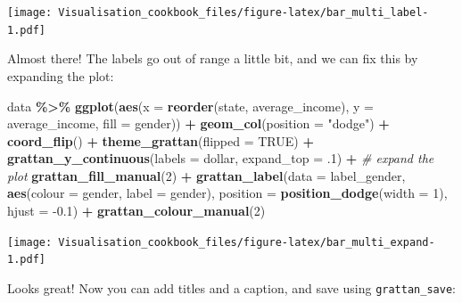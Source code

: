 \documentclass[
]{book}
\newenvironment{Shaded}{\begin{snugshade}}{\end{snugshade}}
\newcommand{\CommentTok}[1]{\textcolor[rgb]{0.56,0.35,0.01}{\textit{#1}}}
\newcommand{\DataTypeTok}[1]{\textcolor[rgb]{0.13,0.29,0.53}{#1}}
\newcommand{\DecValTok}[1]{\textcolor[rgb]{0.00,0.00,0.81}{#1}}
\newcommand{\FloatTok}[1]{\textcolor[rgb]{0.00,0.00,0.81}{#1}}
\newcommand{\KeywordTok}[1]{\textcolor[rgb]{0.13,0.29,0.53}{\textbf{#1}}}
\newcommand{\NormalTok}[1]{#1}
\newcommand{\OperatorTok}[1]{\textcolor[rgb]{0.81,0.36,0.00}{\textbf{#1}}}
\newcommand{\OtherTok}[1]{\textcolor[rgb]{0.56,0.35,0.01}{#1}}
\newcommand{\StringTok}[1]{\textcolor[rgb]{0.31,0.60,0.02}{#1}}
\begin{document}
\texttt{[image: Visualisation\_cookbook\_files/figure-latex/bar\_multi\_label-1.pdf]}

Almost there! The labels go out of range a little bit, and we can fix this by expanding the plot:

\begin{Shaded}
\begin{Highlighting}[]
\NormalTok{data }\OperatorTok{\%\textgreater{}\%}\StringTok{ }
\StringTok{  }\KeywordTok{ggplot}\NormalTok{(}\KeywordTok{aes}\NormalTok{(}\DataTypeTok{x =} \KeywordTok{reorder}\NormalTok{(state, average\_income),}
             \DataTypeTok{y =}\NormalTok{ average\_income,}
             \DataTypeTok{fill =}\NormalTok{ gender)) }\OperatorTok{+}\StringTok{ }
\StringTok{  }\KeywordTok{geom\_col}\NormalTok{(}\DataTypeTok{position =} \StringTok{"dodge"}\NormalTok{) }\OperatorTok{+}\StringTok{ }
\StringTok{  }\KeywordTok{coord\_flip}\NormalTok{() }\OperatorTok{+}\StringTok{ }
\StringTok{  }\KeywordTok{theme\_grattan}\NormalTok{(}\DataTypeTok{flipped =} \OtherTok{TRUE}\NormalTok{) }\OperatorTok{+}\StringTok{ }
\StringTok{  }\KeywordTok{grattan\_y\_continuous}\NormalTok{(}\DataTypeTok{labels =}\NormalTok{ dollar, }
                       \DataTypeTok{expand\_top =} \FloatTok{.1}\NormalTok{) }\OperatorTok{+}\StringTok{ }\CommentTok{\# expand the plot}
\StringTok{  }\KeywordTok{grattan\_fill\_manual}\NormalTok{(}\DecValTok{2}\NormalTok{) }\OperatorTok{+}\StringTok{ }
\StringTok{  }\KeywordTok{grattan\_label}\NormalTok{(}\DataTypeTok{data =}\NormalTok{ label\_gender,}
                \KeywordTok{aes}\NormalTok{(}\DataTypeTok{colour =}\NormalTok{ gender,}
                    \DataTypeTok{label =}\NormalTok{ gender), }
                \DataTypeTok{position =} \KeywordTok{position\_dodge}\NormalTok{(}\DataTypeTok{width =} \DecValTok{1}\NormalTok{), }
                \DataTypeTok{hjust =} \FloatTok{{-}0.1}\NormalTok{) }\OperatorTok{+}\StringTok{ }
\StringTok{  }\KeywordTok{grattan\_colour\_manual}\NormalTok{(}\DecValTok{2}\NormalTok{)}
\end{Highlighting}
\end{Shaded}

\texttt{[image: Visualisation\_cookbook\_files/figure-latex/bar\_multi\_expand-1.pdf]}

Looks great! Now you can add titles and a caption, and save using \texttt{grattan\_save}:
\end{document}
